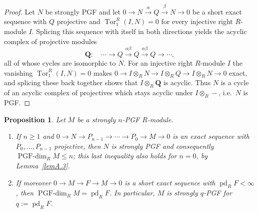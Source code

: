 \documentclass[12pt]{amsart}
\newtheorem{proposition}[theorem]{Proposition}
\theoremstyle{remark}
\theoremstyle{definition}
\theoremstyle{plain}
\DeclareMathOperator{\pd}{pd}
\DeclareMathOperator{\Tor}{Tor}
\newcommand{\PGFdim}{\operatorname{PGF\text{-}dim}}
\begin{document}
\begin{proof}
Let $N$ be strongly PGF and let $0\rightarrow N\xrightarrow{\alpha}Q\xrightarrow{\beta}N\rightarrow 0$ be a short exact sequence with $Q$ projective and $\Tor^R_1(I,N)=0$ for every injective right $R$-module $I$. Splicing this sequence with itself in both directions yields the acyclic complex of projective modules
\[
\mathbf Q:\quad\cdots\rightarrow Q\xrightarrow{\alpha\beta}Q\xrightarrow{\alpha\beta}Q\rightarrow\cdots,
\]
all of whose cycles are isomorphic to $N$. For an injective right $R$-module $I$ the vanishing $\Tor^R_1(I,N)=0$ makes $0\to I\otimes_RN\to I\otimes_RQ\to I\otimes_RN\to0$ exact, and splicing these back together shows that $I\otimes_R\mathbf Q$ is acyclic. Thus $N$ is a cycle of an acyclic complex of projectives which stays acyclic under $I\otimes_R-$, i.e.\ $N$ is PGF.
\end{proof}

\begin{proposition}\label{propA.4}
Let $M$ be a strongly $n$-PGF $R$-module.
\begin{enumerate}
\item[(i)] If $n\ge1$ and $0\to N\to P_{n-1}\to\cdots\to P_0\to M\to0$ is an exact sequence with $P_0,\dots,P_{n-1}$ projective, then $N$ is strongly PGF and consequently $\PGFdim_RM\le n$; this last inequality also holds for $n=0$, by Lemma~\ref{lemA.3}.\item[(ii)] If moreover $0\to M\to F\to M\to0$ is a short exact sequence with $\pd_RF<\infty$, then $\PGFdim_RM=\pd_RF$. In particular, $M$ is strongly $q$-PGF for $q:=\pd_RF$.
\end{enumerate}
\end{proposition}
\end{document}
